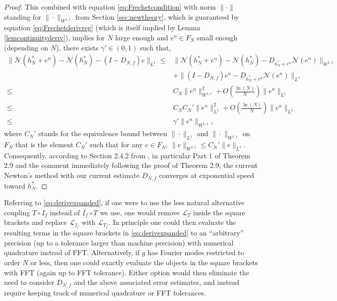 \documentclass[12pt]{article}
\def\L{\mathcal{L}}
\theoremstyle{plain}
\begin{document}
{{\begin{proof}
 This combined with equation \eqref{eq:Frechetcondition} with norm $\|\cdot\|$ standing for $\|\cdot\|_{W^{1,1}}$ from Section \ref{sec:newtheory}, which is guaranteed by equation \eqref{eq:Frechetderivreg} (which is itself implied by Lemma \ref{lemcontinuityderiv}), 
  implies for $N$ large enough and $e^n\in F_N$ small enough (depending on $N$), there exists $\gamma'\in(0,1)$ such that,
\begin{align*}
     \|\mathcal{N}(h^*_N+e^n)-\mathcal{N}(h^*_N)-(I-D_{N,f})e\|_{L^1}\le& \|\mathcal{N}(h^*_N+e^n)-\mathcal{N}(h^*_N)-D_{h^*_N+e^n}\mathcal{N}(e^n)\|_{W^{1,1}}\\
     &+  \|(I-D_{N,f})e^n- D_{h^*_N+e^n}\mathcal{N}(e^n)\|_{L^1}\\
     \leq &C_N\|e^n\|_{W^{1,1}}^{2}+O\left(\frac{\ln(N)}{N}\right)\|e^n\|_{L^1}\\
    \leq &C_NC_N'\|e^n\|_{L^1}^{2}+O\left(\frac{\ln(N)}{N}\right)\|e^n\|_{L^1}\\
     \leq &\gamma'\|e^n\|_{W^{1,1}},
\end{align*}
where $C_N'$ stands for the equivalence bound between $\|\cdot\|_{L^1}$ and $\|\cdot\|_{W^{1,1}}$ on $F_N$ that is the element $C_N'$ such that for any $e\in F_N$, $\|e\|_{W^{1,1}}\leq C_N'\|e\|_{L^1}$.
Consequently, according to Section 2.4.2 from \cite{hinze2008optimization}, in particular Part $1$ of Theorem 2.9 \cite{hinze2008optimization} and the comment immediately following the proof of Theorem 2.9, the current Newton's method with our current estimate $D_{N,f}$ converges at exponential speed toward $h_N^*$.
\end{proof}


Referring to \eqref{eq:derivexpanded}, if one were to use the less natural alternative coupling $T\circ I_f$ instead of $I_f\circ T$ we use, one would remove $\L_T$ inside the square brackets and replace $\L_{I_f}$ with $\L_{T_f}$. 
In principle one could then evaluate the resulting terms in the square brackets in \eqref{eq:derivexpanded} to an ``arbitrary'' precision (up to a tolerance larger than machine precision) with numerical quadrature instead of FFT. 
Alternatively, if $g$ has Fourier modes restricted to order $N$ or less, then one could exactly evaluate the objects in the square brackets with FFT (again up to FFT tolerance).
Either option would then eliminate the need to consider $D_{N,f}$ and the above associated error estimates, and instead require keeping track of numerical quadrature or FFT tolerances.





}}
\end{document}
